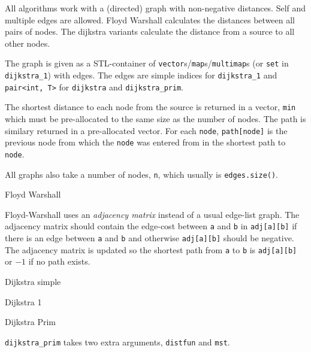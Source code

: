 
All algorithms work with a (directed) graph with non-negative distances.
Self and multiple edges are allowed. Floyd Warshall calculates the distances
between all pairs of nodes. The dijkstra variants calculate the
distance from a source to all other nodes.

The graph is given as a STL-container of
{\tt vector}s/{\tt map}s/{\tt multimap}s
(or {\tt set} in {\tt dijkstra\_1}) with edges.
The edges are simple indices for {\tt dijkstra\_1} and {\tt pair<int, T>} for
{\tt dijkstra} and {\tt dijkstra\_prim}.

The shortest distance to each node from the source is returned in a vector,
{\tt min} which must be pre-allocated to the same size as the number of nodes.
The path is similary returned in a pre-allocated vector. For each {\tt node},
{\tt path[node]} is the previous node from which the {\tt node} was entered
from in the shortest path to {\tt node}.

All graphs also take a number of nodes, {\tt n}, which usually is
{\tt edges.size()}.

\begin{algorithm}{Floyd Warshall}

Floyd-Warshall uses an \emph{adjacency matrix} instead of a usual edge-list
graph. The adjacency matrix should contain the edge-cost between
{\tt a} and {\tt b} in {\tt adj[a][b]} if there is an edge between
{\tt a} and {\tt b} and otherwise {\tt adj[a][b]} should be negative.
The adjacency matrix is updated so the shortest path from {\tt a} to
{\tt b} is {\tt adj[a][b]} or $-1$ if no path exists.
\end{algorithm}

\begin{algorithm}{Dijkstra simple}
\end{algorithm}

\begin{algorithm}{Dijkstra 1}
\end{algorithm}

\begin{algorithm}{Dijkstra Prim}

{\tt dijkstra\_prim} takes two extra arguments, {\tt distfun} and {\tt mst}.
\end{algorithm}
